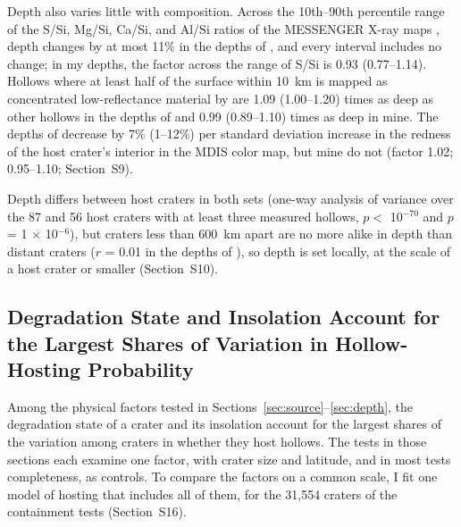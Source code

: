 \documentclass[article,review]{planetary}
\begin{document}
Depth also varies little with composition. Across the 10th--90th percentile range of the S/Si, Mg/Si, Ca/Si, and Al/Si ratios of the MESSENGER X-ray maps \parencite{nittler2020}, depth changes by at most 11\% in the depths of \textcite{blewett2016}, and every interval includes no change; in my depths, the factor across the range of S/Si is 0.93 (0.77--1.14). Hollows where at least half of the surface within 10~km is mapped as concentrated low-reflectance material by \textcite{klima2018} are 1.09 (1.00--1.20) times as deep as other hollows in the depths of \textcite{blewett2016} and 0.99 (0.89--1.10) times as deep in mine. The depths of \textcite{blewett2016} decrease by 7\% (1--12\%) per standard deviation increase in the redness of the host crater's interior in the MDIS color map, but mine do not (factor 1.02; 0.95--1.10; Section~S9).

Depth differs between host craters in both sets (one-way analysis of variance over the 87 and 56 host craters with at least three measured hollows, $p <$ 10$^{-70}$ and $p$ = 1 $\times$ 10$^{-6}$), but craters less than 600~km apart are no more alike in depth than distant craters ($r$ = 0.01 in the depths of \textcite{blewett2016}), so depth is set locally, at the scale of a host crater or smaller (Section~S10).

\FloatBarrier
\subsection{Degradation State and Insolation Account for the Largest Shares of Variation in Hollow-Hosting Probability}
\label{sec:joint}
Among the physical factors tested in Sections~\ref{sec:source}--\ref{sec:depth}, the degradation state of a crater and its insolation account for the largest shares of the variation among craters in whether they host hollows. The tests in those sections each examine one factor, with crater size and latitude, and in most tests completeness, as controls. To compare the factors on a common scale, I fit one model of hosting that includes all of them, for the 31,554 craters of the containment tests (Section~S16).
\end{document}
